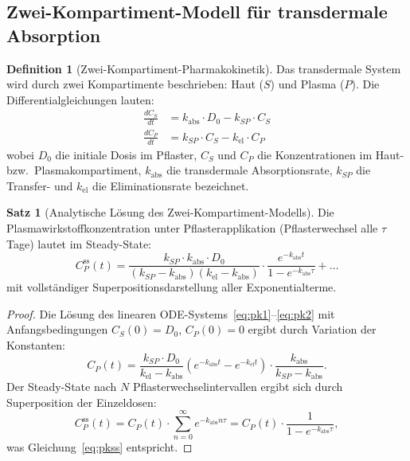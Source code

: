 ﻿\documentclass[a4paper,12pt]{article}
\theoremstyle{definition}
\newtheorem{definition}{Definition}
\newtheorem{satz}{Satz}
\begin{document}
\subsection{Zwei-Kompartiment-Modell für transdermale Absorption}

\begin{definition}[Zwei-Kompartiment-Pharmakokinetik]
Das transdermale System wird durch zwei Kompartimente beschrieben: Haut ($S$) und Plasma ($P$).
Die Differentialgleichungen lauten:
\begin{align}
  \frac{dC_S}{dt} &= k_{\mathrm{abs}} \cdot D_0 - k_{SP} \cdot C_S \label{eq:pk1}\\
  \frac{dC_P}{dt} &= k_{SP} \cdot C_S - k_{\mathrm{el}} \cdot C_P \label{eq:pk2}
\end{align}
wobei $D_0$ die initiale Dosis im Pflaster, $C_S$ und $C_P$ die Konzentrationen im Haut- bzw.\ Plasmakompartiment, $k_{\mathrm{abs}}$ die transdermale Absorptionsrate, $k_{SP}$ die Transfer- und $k_{\mathrm{el}}$ die Eliminationsrate bezeichnet.
\end{definition}

\begin{satz}[Analytische Lösung des Zwei-Kompartiment-Modells]
Die Plasmawirkstoffkonzentration unter Pflasterapplikation (Pflasterwechsel alle $\tau$ Tage) lautet im Steady-State:
\begin{equation}
  C_P^{\mathrm{ss}}(t) = \frac{k_{SP} \cdot k_{\mathrm{abs}} \cdot D_0}{(k_{SP} - k_{\mathrm{abs}})(k_{\mathrm{el}} - k_{\mathrm{abs}})} \cdot
  \frac{e^{-k_{\mathrm{abs}} t}}{1 - e^{-k_{\mathrm{abs}}\tau}} + \ldots
  \label{eq:pkss}
\end{equation}
mit vollständiger Superpositionsdarstellung aller Exponentialterme.
\end{satz}

\begin{proof}
Die Lösung des linearen ODE-Systems~\eqref{eq:pk1}--\eqref{eq:pk2} mit Anfangsbedingungen $C_S(0) = D_0$, $C_P(0) = 0$ ergibt durch Variation der Konstanten:
\[
  C_P(t) = \frac{k_{SP} \cdot D_0}{k_{\mathrm{el}} - k_{\mathrm{abs}}} \left( e^{-k_{\mathrm{abs}}t} - e^{-k_{\mathrm{el}}t} \right) \cdot \frac{k_{\mathrm{abs}}}{k_{SP} - k_{\mathrm{abs}}}.
\]
Der Steady-State nach $N$ Pflasterwechselintervallen ergibt sich durch Superposition der Einzeldosen:
\[
  C_P^{\mathrm{ss}}(t) = C_P(t) \cdot \sum_{n=0}^{\infty} e^{-k_{\mathrm{abs}} n \tau} = C_P(t) \cdot \frac{1}{1 - e^{-k_{\mathrm{abs}}\tau}},
\]
was Gleichung~\eqref{eq:pkss} entspricht. 
\end{proof}
\end{document}
